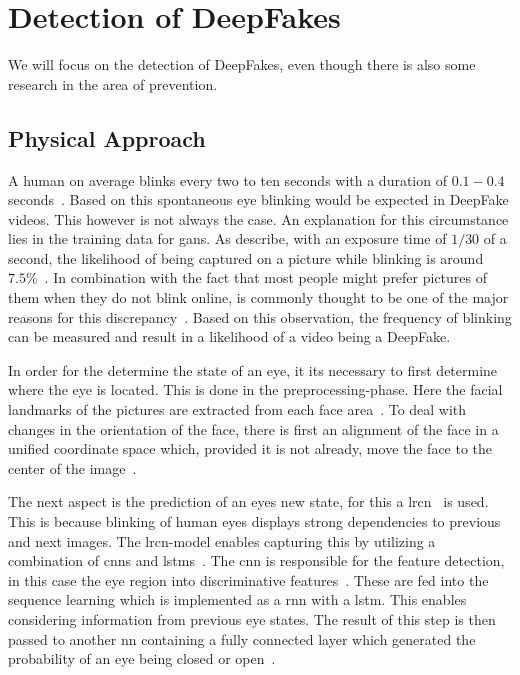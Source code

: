 \section{Detection of DeepFakes}
We will focus on the detection of DeepFakes, even though there is also some 
research in the area of prevention.

\subsection{Physical Approach}
A human on average blinks every two to ten seconds with a duration of \(0.1-0.4\)
seconds~\cite{li_ictu_2018}. Based on this spontaneous eye blinking would be
expected in DeepFake videos. This however is not always the case. An explanation
for this circumstance lies in the training data for \glspl{gan}. As 
\textcite{li_ictu_2018} describe, with an exposure time of \(1/30\) of a second,
the likelihood of being captured on a picture while blinking is around \(7.5\%\)~\cite{li_ictu_2018}.
In combination with the fact that most people might prefer pictures of them when
they do not blink online, is commonly thought to be one of the major reasons for
this discrepancy~\cite{pishori_detecting_2020}. Based on this observation, the
frequency of blinking can be measured and result in a likelihood of a video being
a DeepFake.

\par
In order for the determine the state of an eye, it its necessary to first determine
where the eye is located. This is done in the preprocessing-phase. Here the facial
landmarks of the pictures are extracted from each face area~\cite{li_ictu_2018}.
To deal with changes in the orientation of the face, there is first an alignment
of the face in a unified coordinate space which, provided it is not already,
move the face to the center of the image~\cite{li_ictu_2018}.

\par
The next aspect is the prediction of an eyes new state, for this a \gls{lrcn}~\cite{donahue_long-term_2014}
is used. This is because blinking of human eyes displays strong dependencies to
previous and next images. The \gls{lrcn}-model enables capturing this by utilizing
a combination of \glspl{cnn} and \glspl{lstm}~\cite{donahue_long-term_2014}.
The \gls{cnn} is responsible for the feature detection, in this case the eye
region into discriminative features~\cite{li_ictu_2018,donahue_long-term_2014}. 
These are fed into the sequence learning which is implemented as a \gls{rnn} 
with a \gls{lstm}. This enables considering information from previous eye states.
The result of this step is then passed to another \gls{nn} containing a fully
connected layer which generated the probability of an eye being closed or open~\cite{li_ictu_2018}.

